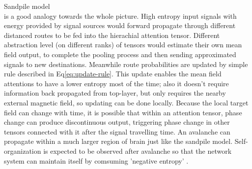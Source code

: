 \documentclass[11pt,a4paper]{article}
\begin{document}
\begin{multicols}{2}
  Sandpile model \\ \cite{PhysRevLett.59.381} is a good analogy towards the whole picture. High entropy input signals with energy provided by signal sources would 
  forward propagate through different distanced routes to be fed into the hierachial attention tensor. Different abstraction level (on different ranks) of tensors would estimate 
  their own mean field output, to complete the pooling process and then sending approximated signals to new destinations. Meanwhile route probabilities are updated by simple rule 
  described in Eq\ref{eq:update-rule}. This update enables the mean field attentions to have a lower entropy most of the time; also it doesn't require information back propagated from top-layer, 
  but only requires the nearby external magnetic field, so updating can be done locally. Because the local target field can change with time, it is possible that 
  within an attention tensor, phase change can produce discontinuous output, triggering phase change in other tensors connected with it after the signal travelling time. 
  An avalanche can propagate within a much larger region of brain just like the sandpile model. Self-organization is expected to be observed after avalanche so that the network system can maintain itself by comsuming 'negative entropy' \cite{schrodinger1962life}. 


\end{multicols}
\end{document}
